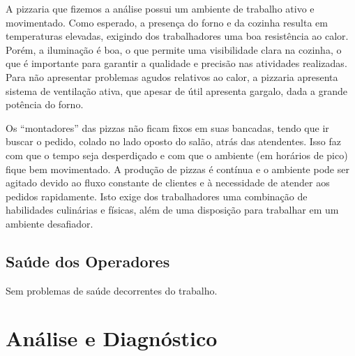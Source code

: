 \documentclass[11pt]{article}
\begin{document}
A pizzaria que fizemos a análise possui um ambiente de trabalho ativo e movimentado. Como esperado, a presença do forno e da cozinha resulta em temperaturas elevadas, exigindo dos trabalhadores uma boa resistência ao calor. Porém, a iluminação é boa, o que permite uma visibilidade clara na cozinha, o que é importante para garantir a qualidade e precisão nas atividades realizadas. Para não apresentar problemas agudos relativos ao calor, a pizzaria apresenta sistema de ventilação ativa, que apesar de útil apresenta gargalo, dada a grande potência do forno. 

Os “montadores” das pizzas não ficam fixos em suas bancadas, tendo que ir buscar o pedido, colado no lado oposto do salão, atrás das atendentes. Isso faz com que o tempo seja desperdiçado e com que o ambiente (em horários de pico) fique bem movimentado. A produção de pizzas é contínua e o ambiente pode ser agitado devido ao fluxo constante de clientes e à necessidade de atender aos pedidos rapidamente. Isto exige dos trabalhadores uma combinação de habilidades culinárias e físicas, além de uma disposição para trabalhar em um ambiente desafiador.


\subsection{Saúde dos Operadores}

Sem problemas de saúde decorrentes do trabalho.



\section{Análise e Diagnóstico}
\end{document}
